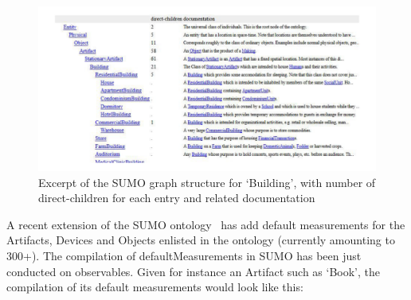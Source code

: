 \documentclass[11pt]{article}
\begin{document}

\begin{figure}[ht!]
\includegraphics[width=\textwidth]{building_SUMO1}
\caption{Excerpt of the SUMO graph structure for `Building', with number of direct-children for each entry and related documentation}\label{building_SUMO}
\end{figure}


A recent extension of the SUMO ontology~\cite[Suggested Upper Merged Ontology]{nilespease2001sumo} has add
default measurements for the Artifacts, Devices and Objects enlisted in the ontology (currently amounting to 300+). 
The compilation of defaultMeasurements in SUMO has been just conducted on observables. Given for instance an Artifact such as `Book', the compilation of its default measurements would look like this:
\end{document}

